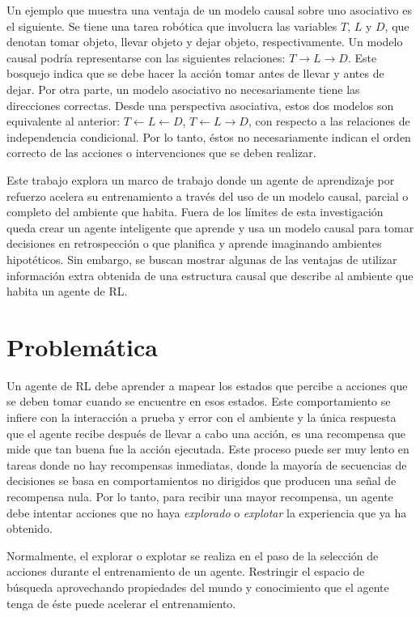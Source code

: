 Un ejemplo que muestra una ventaja de un modelo causal sobre uno asociativo es el siguiente.
Se tiene una tarea robótica que involucra las variables $T$, $L$ y $D$, que denotan tomar objeto, llevar objeto y
dejar objeto, respectivamente.
Un modelo causal podría representarse con las
siguientes relaciones: $T \rightarrow L \rightarrow D$.
Este bosquejo indica que se debe hacer la acción tomar antes de llevar y antes de
dejar. Por otra parte, un modelo asociativo no necesariamente tiene las direcciones
correctas. 
Desde una perspectiva asociativa, estos dos modelos son equivalente al anterior: $T \leftarrow L\leftarrow D$, $T\leftarrow L\rightarrow D$,
con respecto a las relaciones de independencia condicional.
Por lo tanto, éstos no necesariamente indican el orden correcto de las acciones o intervenciones que se deben
realizar.

Este trabajo explora un marco de trabajo donde un agente
de aprendizaje por refuerzo acelera su entrenamiento a través
del uso de un modelo causal, parcial o completo del ambiente
que habita. Fuera de los límites de
esta investigación queda
crear un agente inteligente que aprende y usa un modelo causal para tomar decisiones en retrospección o que
planifica y aprende imaginando ambientes hipotéticos.
Sin embargo, se buscan mostrar algunas de las ventajas de utilizar información extra obtenida de una estructura causal que 
describe al ambiente que habita un agente de RL.


\section{Problemática}

Un agente de RL debe aprender a mapear los estados
que percibe a acciones que se deben tomar cuando
se encuentre en esos estados. Este comportamiento
se infiere con la interacción a prueba y error con el ambiente y la única respuesta que el agente recibe después de llevar a cabo una acción, es una recompensa que mide que tan buena fue la acción ejecutada.
Este proceso puede ser muy lento en tareas donde no hay recompensas inmediatas, donde la mayoría de secuencias
de decisiones se basa en comportamientos no dirigidos
que producen una señal de recompensa nula.
Por lo tanto, para recibir una mayor recompensa, un agente debe intentar acciones que no haya \textit{explorado} o \textit{explotar} la experiencia que ya ha obtenido.

Normalmente, el explorar o explotar se realiza en el 
paso de la selección de acciones durante el entrenamiento de un agente. Restringir el espacio de búsqueda aprovechando 
propiedades del mundo y conocimiento que el agente tenga
de éste puede acelerar el entrenamiento.

